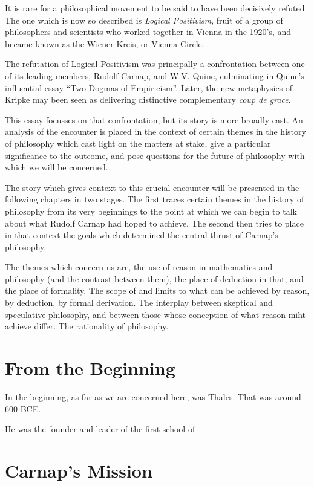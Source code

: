 It is rare for a philosophical movement to be said to have been decisively refuted.
The one which is now so described is {\it Logical Positivism}, fruit of a group of philosophers and scientists who worked together in Vienna in the 1920's, and became known as the Wiener Kreis, or Vienna Circle.

The refutation of Logical Positivism was principally a confrontation between one of its leading members, Rudolf Carnap, and W.V. Quine, culminating in Quine's influential essay ``Two Dogmas of Empiricism''.
Later, the new metaphysics of Kripke may been seen as delivering distinctive complementary {\it coup de grace}.

This essay focusses on that confrontation, but its story is more broadly cast.
An analysis of the encounter is placed in the context of certain themes in the history of philosophy which cast light on the matters at stake, give a particular significance to the outcome, and pose questions for the future of philosophy with which we will be concerned.

The story which gives context to this crucial encounter will be presented in the following chapters in two stages.
The first traces certain themes in the history of philosophy from its very beginnings to the point at which we can begin to talk about what Rudolf Carnap had hoped to achieve.
The second then tries to place in that context the goals which determined the central thrust of Carnap's philosophy.

The themes which concern us are, the use of reason in mathematics and philosophy (and the contrast between them), the place of deduction in that, and the place of formality.
The scope of and limits to what can be achieved by reason, by deduction, by formal derivation.
The interplay between skeptical and speculative philosophy, and between those whose conception of what reason miht achieve differ.
The rationality of philosophy.

\chapter{From the Beginning}

In the beginning, as far as we are concerned here, was Thales.
That was around 600 BCE.

He was the founder and leader of the first school of  
\chapter{Carnap's Mission}

